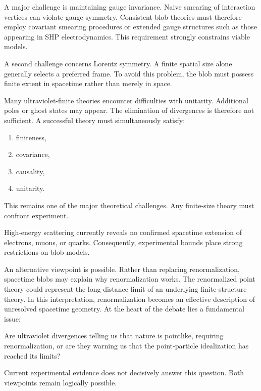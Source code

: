 A major challenge is maintaining gauge invariance.
Naive smearing of interaction vertices can violate gauge symmetry.
Consistent blob theories must therefore employ covariant smearing procedures
or extended gauge structures such as those appearing in SHP electrodynamics.
This requirement strongly constrains viable models.

A second challenge concerns Lorentz symmetry.
A finite spatial size alone generally selects a preferred frame.
To avoid this problem, the blob must possess finite extent in spacetime
rather than merely in space.

Many ultraviolet-finite theories encounter difficulties with unitarity.
Additional poles or ghost states may appear.
The elimination of divergences is therefore not sufficient.
A successful theory must simultaneously satisfy:
\begin{enumerate}
\item finiteness,
\item covariance,
\item causality,
\item unitarity.
\end{enumerate}
This remains one of the major theoretical challenges.
Any finite-size theory must confront experiment.

High-energy scattering currently reveals no confirmed spacetime extension of electrons, muons, or quarks.
Consequently,
experimental bounds place strong restrictions on blob models.

An alternative viewpoint is possible.
Rather than replacing renormalization, spacetime blobs may explain why
renormalization works.
The renormalized point theory could represent the long-distance limit of 
an underlying finite-structure theory.
In this interpretation, renormalization becomes an effective description 
of unresolved spacetime geometry.
At the heart of the debate lies a fundamental issue:
\begin{center}
Are ultraviolet divergences telling us that nature is pointlike, 
    requiring renormalization, or are they warning us that the 
    point-particle idealization has reached its limits?
\end{center}
Current experimental evidence does not decisively answer this question.
Both viewpoints remain logically possible.

